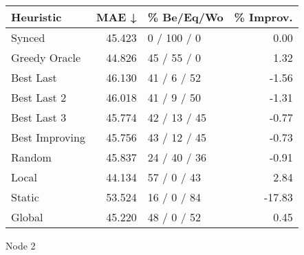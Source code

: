 \begin{tabular}{lrlr}
\toprule
\textbf{Heuristic} & \textbf{MAE ↓} & \textbf{\% Be/Eq/Wo} & \textbf{\% Improv.} \\
\midrule
            Synced &         45.423 &          0 / 100 / 0 &                0.00 \\
     Greedy Oracle &         44.826 &          45 / 55 / 0 &                1.32 \\
         Best Last &         46.130 &          41 / 6 / 52 &               -1.56 \\
       Best Last 2 &         46.018 &          41 / 9 / 50 &               -1.31 \\
       Best Last 3 &         45.774 &         42 / 13 / 45 &               -0.77 \\
    Best Improving &         45.756 &         43 / 12 / 45 &               -0.73 \\
            Random &         45.837 &         24 / 40 / 36 &               -0.91 \\
             Local &         44.134 &          57 / 0 / 43 &                2.84 \\
            Static &         53.524 &          16 / 0 / 84 &              -17.83 \\
            Global &         45.220 &          48 / 0 / 52 &                0.45 \\
\bottomrule
\end{tabular}
\caption{Node 2}
\label{tab:non_lr05_le2_bs4_2}
